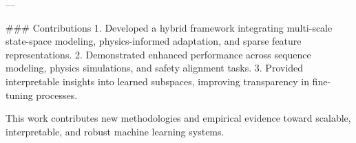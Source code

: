 ---

### Contributions  
1. Developed a hybrid framework integrating multi-scale state-space modeling, physics-informed adaptation, and sparse feature representations.  
2. Demonstrated enhanced performance across sequence modeling, physics simulations, and safety alignment tasks.  
3. Provided interpretable insights into learned subspaces, improving transparency in fine-tuning processes.  

This work contributes new methodologies and empirical evidence toward scalable, interpretable, and robust machine learning systems. 